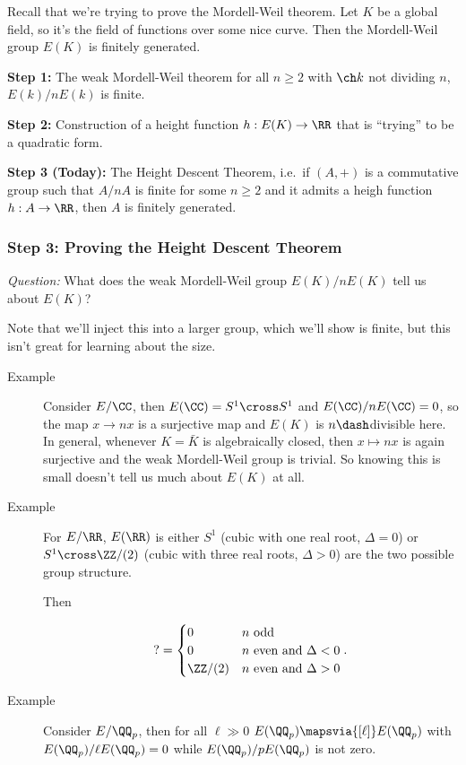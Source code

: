 Recall that we're trying to prove the Mordell-Weil theorem. Let \(K\) be
a global field, so it's the field of functions over some nice curve.
Then the Mordell-Weil group \(E(K)\) is finitely generated.

\textbf{Step 1:} The weak Mordell-Weil theorem for all \(n\geq 2\) with
\(\ch k\) not dividing \(n\), \(E(k) / n E(k)\) is finite.

\textbf{Step 2:} Construction of a height function \(h: E(K) \to \RR\)
that is ``trying'' to be a quadratic form.

\textbf{Step 3 (Today):} The Height Descent Theorem, i.e.~if \((A, +)\)
is a commutative group such that \(A/nA\) is finite for some \(n\geq 2\)
and it admits a heigh function \(h: A\to \RR\), then \(A\) is finitely
generated.

\hypertarget{step-3-proving-the-height-descent-theorem}{%
\subsubsection{Step 3: Proving the Height Descent
Theorem}\label{step-3-proving-the-height-descent-theorem}}

\emph{Question:} What does the weak Mordell-Weil group \(E(K)/ nE(K)\)
tell us about \(E(K)\)?

Note that we'll inject this into a larger group, which we'll show is
finite, but this isn't great for learning about the size.

\begin{description}
\item[Example]
Consider \(E/\CC\), then \(E(\CC) = S^1 \cross S^1\) and
\(E(\CC)/nE(\CC) = 0\), so the map \(x\to nx\) is a surjective map and
\(E(K)\) is \(n\dash\)divisible here. In general, whenever
\(K = \bar K\) is algebraically closed, then \(x \mapsto nx\) is again
surjective and the weak Mordell-Weil group is trivial. So knowing this
is small doesn't tell us much about \(E(K)\) at all.
\item[Example]
For \(E/\RR\), \(E(\RR)\) is either \(S^1\) (cubic with one real root,
\(\Delta = 0\)) or \(S^1 \cross \ZZ/(2)\) (cubic with three real roots,
\(\Delta > 0\)) are the two possible group structure.

Then

\begin{align*}
? = 
\begin{cases}
0 & n \text{ odd } \\
0 & n \text{ even and } \Delta < 0 \\
\ZZ/(2) & n \text{ even and } \Delta > 0
\end{cases}
.\end{align*}
\item[Example]
Consider \(E/\QQ_p\), then for all \(\ell \gg 0\)
\(E(\QQ_p) \mapsvia{[\ell]} E(\QQ_p)\) with
\(E(\QQ_p)/\ell E(\QQ_p) = 0\) while \(E(\QQ_p) / p E(\QQ_p)\) is not
zero.
\end{description}

